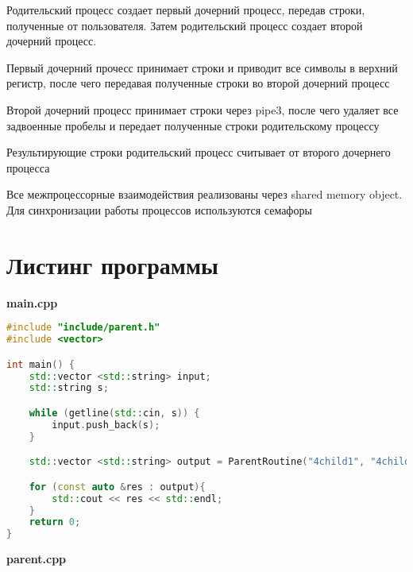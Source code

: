 \documentclass[pdf, unicode, 12pt, a4paper,oneside,fleqn]{article}
\begin{document}
Родительский процесс создает первый дочерний процесс, передав строки, полученные от пользователя. Затем родительский процесс создает второй дочерний процесс.

Первый дочерний прочесс принимает строки и приводит все символы в верхний регистр, после чего передавая полученные строки во второй дочерний процесс

Второй дочерний процесс принимает строки через pipe3, после чего удаляет все задвоенные пробелы и передает полученные строки родительскому процессу

Результирующие строки родительский процесс считывает от второго дочернего процесса

Все межпроцессорные взаимодействия реализованы через shared memory object. Для синхронизации работы процессов используются семафоры

\section{Листинг программы}

{\large\textbf{main.cpp}}

\begin{lstlisting}[language=C++]
#include "include/parent.h"
#include <vector>

int main() {
    std::vector <std::string> input;
    std::string s;

    while (getline(std::cin, s)) {
        input.push_back(s);
    }

    std::vector <std::string> output = ParentRoutine("4child1", "4child2", input);

    for (const auto &res : output){
        std::cout << res << std::endl;
    }
    return 0;
}

\end{lstlisting}

{\large\textbf{parent.cpp}}
\end{document}
